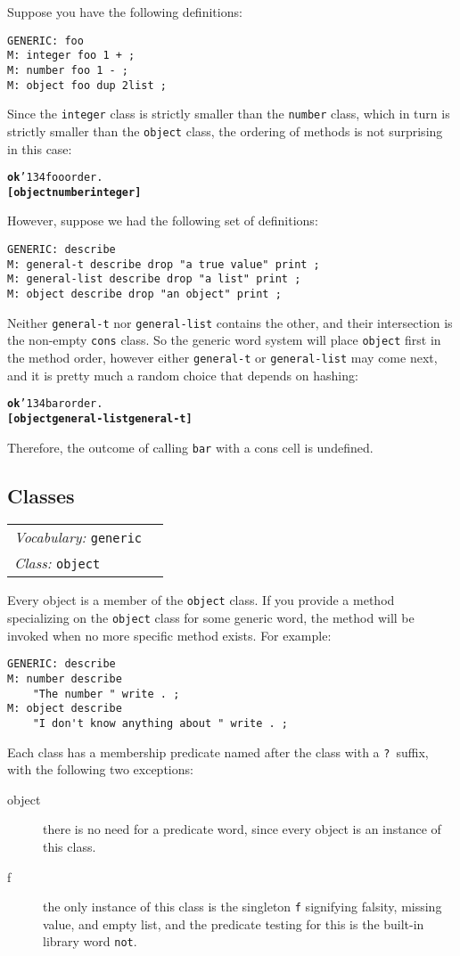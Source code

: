 \documentclass{book}
\newcommand{\bs}{\char'134}
\newcommand{\vocabulary}[1]{\emph{Vocabulary:} \texttt{#1}&\\}
\newcommand{\classword}[1]{\index{\texttt{#1}}\emph{Class:} \texttt{#1}&\\}
\newcommand{\wordtable}[1]{


\begin{tabularx}{12cm}{lX}
\hline
#1
\hline
\end{tabularx}

}
\begin{document}
Suppose you have the following definitions:
\begin{verbatim}
GENERIC: foo
M: integer foo 1 + ;
M: number foo 1 - ;
M: object foo dup 2list ;
\end{verbatim}
Since the \texttt{integer} class is strictly smaller than the \texttt{number} class, which in turn is strictly smaller than the \texttt{object} class, the ordering of methods is not surprising in this case:
\begin{alltt}
\textbf{ok} \bs foo order .
\textbf{[ object number integer ]}
\end{alltt}
However, suppose we had the following set of definitions:
\begin{verbatim}
GENERIC: describe
M: general-t describe drop "a true value" print ;
M: general-list describe drop "a list" print ;
M: object describe drop "an object" print ;
\end{verbatim}
Neither \texttt{general-t} nor \texttt{general-list} contains the other, and their intersection is the non-empty \texttt{cons} class. So the generic word system will place \texttt{object} first in the method order, however either \texttt{general-t} or \texttt{general-list} may come next, and it is pretty much a random choice that depends on hashing:
\begin{alltt}
\textbf{ok} \bs bar order .
\textbf{[ object general-list general-t ]}
\end{alltt}

Therefore, the outcome of calling \texttt{bar} with a cons cell is undefined.

\subsection{Classes}

\wordtable{
\vocabulary{generic}
\classword{object}
}
Every object is a member of the \texttt{object} class. If you provide a method specializing
on the \texttt{object} class for some generic word, the method will be
invoked when no more specific method exists. For example:
\begin{verbatim}
GENERIC: describe
M: number describe
    "The number " write . ;
M: object describe
    "I don't know anything about " write . ;
\end{verbatim}
Each class has a membership predicate named
after the class with a \texttt{?}~suffix, with the following two exceptions:
\begin{description}
\item[object] there is no need for a predicate word, since
every object is an instance of this class.
\item[f] the only instance of this class is the singleton
\texttt{f} signifying falsity, missing value, and empty list, and the predicate testing for this is the built-in library word \texttt{not}.
\end{description}
\end{document}

